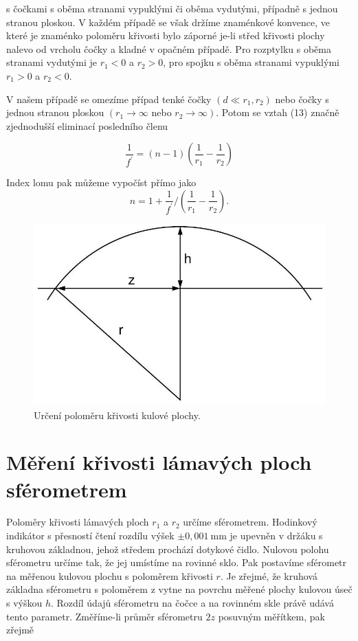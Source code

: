 \documentclass[czech,11pt,a4paper]{article}
\begin{document}
\begin{multicols}{2}
s čočkami s oběma stranami vypuklými či oběma vydutými, případně s jednou stranou ploskou. V každém případě se však držíme znaménkové konvence, ve které je znaménko poloměru křivosti bylo záporné je-li střed křivosti plochy nalevo od vrcholu čočky a kladné v opačném případě. Pro rozptylku s oběma stranami vydutými je $r_{1}<0$ a $r_{2}>0$, pro spojku s oběma stranami vypuklými $r_{1}>0$ a $r_{2}<0$.

V našem případě se omezíme případ tenké čočky $\left(d \ll r_{1}, r_{2}\right)$ nebo čočky s jednou stranou ploskou $\left(r_{1} \rightarrow \infty\right.$ nebo $\left.r_{2} \rightarrow \infty\right)$. Potom se vztah (13) značně zjednodušší eliminací posledního členu

\begin{equation}
	\frac{1}{f^{\prime}}=(n-1)\left(\frac{1}{r_{1}}-\frac{1}{r_{2}}\right)
\end{equation}


Index lomu pak můžeme vypočíst přímo jako
\begin{equation}
	n=1+\frac{1}{f^{\prime}} /\left(\frac{1}{r_{1}}-\frac{1}{r_{2}}\right) .
\end{equation}

\begin{figure}[H]
	\includegraphics[width = 0.95\linewidth, center]{2024_12_03_2b013636ff75d184213cg-6}
	\caption{Určení poloměru křivosti kulové plochy.}
\end{figure}



\section*{Měření křivosti lámavých ploch sférometrem}

Poloměry křivosti lámavých ploch $r_{1}$ a $r_{2}$ určíme sférometrem.  Hodinkový indikátor s přesností čtení rozdílu výšek $\pm 0,001 \mathrm{~mm}$ je upevněn v držáku s kruhovou základnou, jehož středem prochází dotykové čidlo. Nulovou polohu sférometru určíme tak, že jej umístíme na rovinné sklo. Pak postavíme sférometr na měřenou kulovou plochu s poloměrem křivosti $r$. Je zřejmé, že kruhová základna sférometru s poloměrem z vytne na povrchu měřené plochy kulovou úseč s výškou $h$. Rozdíl údajů sférometru na čočce a na rovinném skle právě udává tento parametr. Změříme-li průměr sférometru $2 z$ posuvným měřítkem, pak zřejmě


\end{multicols}
\end{document}
